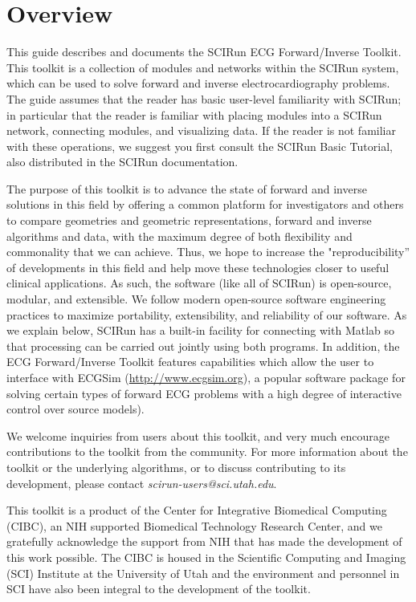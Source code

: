 \chapter{Overview}

\begin{introduction}

This guide describes and documents the SCIRun ECG Forward/Inverse
Toolkit. This toolkit is a collection of modules and networks
within the SCIRun system, which can be used to solve forward and inverse
electrocardiography problems. The guide assumes that the reader has basic
user-level familiarity with SCIRun; in particular that the reader is
familiar with placing modules into a SCIRun network, connecting modules,
and visualizing data. If the reader is not familiar with these operations,
we suggest you first consult the SCIRun Basic Tutorial, also distributed in
the SCIRun documentation.

The purpose of this toolkit is to advance the state of forward and inverse
solutions in this field by offering a common platform for investigators and
others to compare geometries and geometric representations, forward and inverse algorithms and data, with the maximum degree of both flexibility
and commonality that we can achieve. Thus, we hope to increase the
"reproducibility'' of developments in this field and help
move these technologies closer to useful clinical applications. As such, the
software (like all of SCIRun) is open-source, modular, and extensible. We
follow modern open-source software engineering practices to maximize
portability, extensibility, and reliability of our software. As we explain below, SCIRun has a
built-in facility for connecting with Matlab so that processing can be
carried out jointly using both programs. In
addition, the ECG Forward/Inverse Toolkit features capabilities which allow
the user to interface with ECGSim (\href{http://www.ecgsim.org}{http://www.ecgsim.org}), a
popular software package for solving certain types of forward ECG problems
with a high degree of interactive control over source models).

We welcome inquiries from users about this toolkit, and very much encourage
contributions to the toolkit from the community. For more information
about the toolkit or the underlying algorithms, or to discuss contributing to
its development, please contact \textit{scirun-users@sci.utah.edu}.

This toolkit is a product of the Center for Integrative Biomedical
Computing (CIBC), an NIH supported Biomedical Technology Research Center,
and we gratefully acknowledge the support from NIH that has made the
development of this work possible. The CIBC is housed in the Scientific
Computing and Imaging (SCI) Institute at the University of Utah and the
environment and personnel in SCI have also been integral to the development of the toolkit.

\end{introduction}

